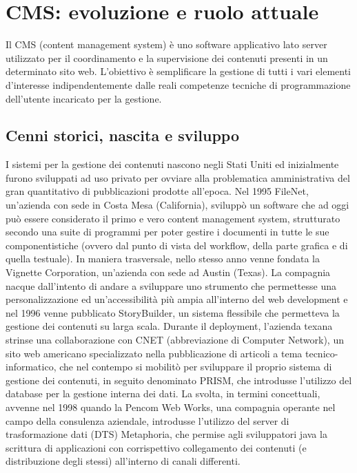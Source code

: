 \chapter{CMS: evoluzione e ruolo attuale}
\label{chap:CMSEvoluzioneRuolo}


Il CMS (content management system) è uno software applicativo lato server utilizzato per il coordinamento e la supervisione dei contenuti presenti in un determinato sito web. L'obiettivo è semplificare la gestione di tutti i vari elementi d'interesse indipendentemente dalle reali competenze tecniche di programmazione dell'utente incaricato per la gestione.\hfill \break


\section{Cenni storici, nascita e sviluppo}
I sistemi per la gestione dei contenuti nascono negli Stati Uniti ed inizialmente furono sviluppati ad uso privato per ovviare alla problematica amministrativa del gran quantitativo di pubblicazioni prodotte all'epoca.
Nel 1995 FileNet, un'azienda con sede in Costa Mesa (California), sviluppò un software che ad oggi può essere considerato il primo e vero content management system, strutturato secondo una suite di programmi per poter gestire i documenti in tutte le sue componentistiche (ovvero dal punto di vista del workflow, della parte grafica e di quella testuale). In maniera trasversale, nello stesso anno venne fondata la Vignette Corporation, un'azienda con sede ad Austin (Texas). 
La compagnia nacque dall'intento di andare a sviluppare uno strumento che permettesse una personalizzazione ed un'accessibilità più ampia all'interno del web development e nel 1996 venne pubblicato StoryBuilder, un sistema flessibile che permetteva la gestione dei contenuti su larga scala.
Durante il deployment, l'azienda texana strinse una collaborazione con CNET (abbreviazione di Computer Network), un sito web americano specializzato nella pubblicazione di articoli a tema tecnico-informatico, che nel contempo si mobilitò per sviluppare il proprio sistema di gestione dei contenuti, in seguito denominato PRISM, che introdusse l'utilizzo del database per la gestione interna dei dati. 
La svolta, in termini concettuali, avvenne nel 1998 quando la Pencom Web Works, una compagnia operante nel campo della consulenza aziendale, introdusse l'utilizzo del server di trasformazione dati (DTS) Metaphoria, che permise agli sviluppatori java la scrittura di applicazioni con corrispettivo collegamento dei contenuti (e distribuzione degli stessi) all'interno di canali differenti.
